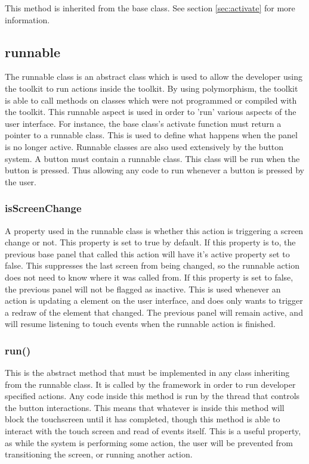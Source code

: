 This method is inherited from the base class. See section \ref{sec:activate} for more information.


\subsection{runnable}
\label{sec:runnable}

The runnable class is an abstract class which is used to allow the developer using the toolkit to run actions inside the toolkit. By using polymorphism, the toolkit is able to call methods on classes which were not programmed or compiled with the toolkit. This runnable aspect is used in order to 'run' various aspects of the user interface. For instance, the base class's activate function must return a pointer to a runnable class. This is used to define what happens when the panel is no longer active. Runnable classes are also used extensively by the button system. A button must contain a runnable class. This class will be run when the button is pressed. Thus allowing any code to run whenever a button is pressed by the user. 

\subsubsection{isScreenChange}

A property used in the runnable class is whether this action is triggering a screen change or not. This property is set to true by default. If this property is to, the previous base panel that called this action will have it's active property set to false. This suppresses the last screen from being changed, so the runnable action does not need to know where it was called from. If this property is set to false, the previous panel will not be flagged as inactive. This is used whenever an action is updating a element on the user interface, and does only wants to trigger a redraw of the element that changed. The previous panel will remain active, and will resume listening to touch events when the runnable action is finished.

\subsubsection{run()}

This is the abstract method that must be implemented in any class inheriting from the runnable class. It is called by the framework in order to run developer specified actions. Any code inside this method is run by the thread that controls the button interactions. This means that whatever is inside this method will block the touchscreen until it has completed, though this method is able to interact with the touch screen and read of events itself. This is a useful property, as while the system is performing some action, the user will be prevented from transitioning the screen, or running another action. 

